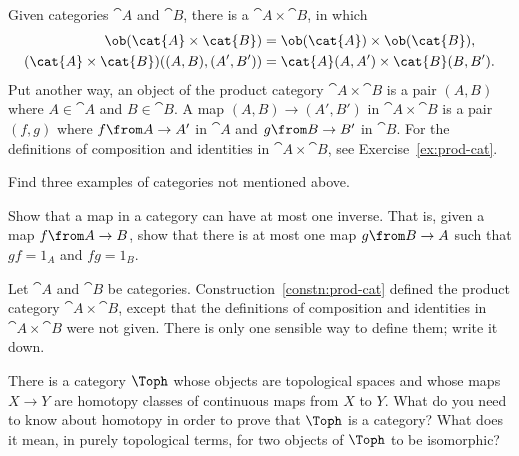 \begin{constn}  
\label{constn:prod-cat}
Given categories $\cat{A}$ and $\cat{B}$, there is a  $\cat{A} \times \cat{B}$,%
%
%
 in which
% 
\begin{align*}
\ob(\cat{A} \times \cat{B})     &
=      
\ob(\cat{A}) \times \ob(\cat{B}),\\
(\cat{A} \times \cat{B})((A, B), (A', B'))      &
=      
\cat{A}(A, A') \times \cat{B}(B, B').
\end{align*}
% 
Put another way, an object of the product category $\cat{A} \times \cat{B}$
is a pair $(A, B)$ where $A \in \cat{A}$ and $B \in \cat{B}$.  A map $(A,
B) \to (A', B')$ in $\cat{A} \times \cat{B}$ is a pair $(f, g)$ where
$f\from A \to A'$ in $\cat{A}$ and $g\from B \to B'$ in $\cat{B}$.  For the
definitions of composition and identities in $\cat{A} \times \cat{B}$, see
Exercise~\ref{ex:prod-cat}.
\end{constn}


\exs


\begin{question}
Find three examples of categories not mentioned above.
\end{question}


\begin{question}        
\label{ex:unique-inverse}
Show that a map in a category can have at most one inverse.  That is, given
a map $f\from A \to B$, show that there is at most one map $g\from B \to A$
such that $gf = 1_A$ and $fg = 1_B$.  
\end{question}


\begin{question}        
\label{ex:prod-cat}
Let $\cat{A}$ and $\cat{B}$ be categories.
Construction~\ref{constn:prod-cat} defined the product category $\cat{A}
\times \cat{B}$, except that the definitions of composition and identities
in $\cat{A} \times \cat{B}$ were not given.  There is only one sensible way
to define them; write it down.
\end{question}


\begin{question}
There is a category $\Toph$%
%
%
whose objects are topological spaces and whose
maps $X \to Y$ are homotopy%
%
%
classes of continuous maps from $X$ to $Y$.  What do you need to know about
homotopy in order to prove that $\Toph$ is a category?  What does it mean,
in purely topological terms, for two objects of $\Toph$ to be isomorphic?
\end{question}



